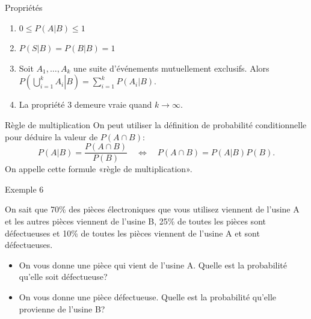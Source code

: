\documentclass{BeamerTemplate}
\begin{document}
\begin{frame}[t]{Propriétés}



 \begin{enumerate}\itemsep3mm
  \item $0\le P(A|B)\le 1$
  \item $P(S|B)=P(B|B)=1$
  \item Soit $A_1,\ldots,A_k$ une suite d'événements \alert{mutuellement
  exclusifs}. Alors $P\left(\left.\bigcup\limits_{i=1}^kA_i\right|B\right)=\sum\limits_{i=1}^k P(A_i|B)$.
  \item La propriété 3 demeure vraie quand $k\to\infty$.
 \end{enumerate}
\end{frame}

\begin{frame}[t]{Règle de multiplication}
On peut utiliser la définition de probabilité conditionnelle pour déduire la valeur de $P(A\cap B)$:
$$P(A|B)=\frac{P(A\cap B)}{P(B)}\quad\Leftrightarrow\quad P(A\cap B)=P(A|B)P(B).$$
On appelle cette formule «règle de multiplication».
\end{frame}
\begin{frame}[t]{Exemple 6}

{\small
On sait que 70\% des pièces électroniques que vous utilisez viennent de l'usine A et les autres pièces viennent de l'usine B, 25\% de toutes les pièces sont défectueuses et 10\% de toutes les pièces viennent de l'usine A et sont défectueuses.

 \begin{itemize}
 \item[a)] On vous donne une  pièce qui vient de l'usine A. Quelle est la probabilité qu'elle soit défectueuse?
 \vspace{1.2cm}
\item[b)] On vous donne une pièce défectueuse. Quelle est la probabilité qu'elle provienne de l'usine B?
    \end{itemize}
     }
\end{frame}

\end{document}
